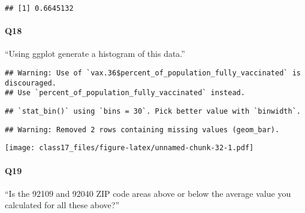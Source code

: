 \documentclass[
]{article}
\newenvironment{Shaded}{\begin{snugshade}}{\end{snugshade}}
\newcommand{\AttributeTok}[1]{\textcolor[rgb]{0.77,0.63,0.00}{#1}}
\newcommand{\CommentTok}[1]{\textcolor[rgb]{0.56,0.35,0.01}{\textit{#1}}}
\newcommand{\DecValTok}[1]{\textcolor[rgb]{0.00,0.00,0.81}{#1}}
\newcommand{\FloatTok}[1]{\textcolor[rgb]{0.00,0.00,0.81}{#1}}
\newcommand{\FunctionTok}[1]{\textcolor[rgb]{0.00,0.00,0.00}{#1}}
\newcommand{\NormalTok}[1]{#1}
\newcommand{\SpecialCharTok}[1]{\textcolor[rgb]{0.00,0.00,0.00}{#1}}
\newcommand{\StringTok}[1]{\textcolor[rgb]{0.31,0.60,0.02}{#1}}
\begin{document}
\begin{verbatim}
## [1] 0.6645132
\end{verbatim}

\hypertarget{q18}{%
\paragraph{Q18}\label{q18}}

``Using ggplot generate a histogram of this data.''

\begin{Shaded}
\end{Shaded}

\begin{verbatim}
## Warning: Use of `vax.36$percent_of_population_fully_vaccinated` is discouraged.
## Use `percent_of_population_fully_vaccinated` instead.
\end{verbatim}

\begin{verbatim}
## `stat_bin()` using `bins = 30`. Pick better value with `binwidth`.
\end{verbatim}

\begin{verbatim}
## Warning: Removed 2 rows containing missing values (geom_bar).
\end{verbatim}

\texttt{[image: class17\_files/figure-latex/unnamed-chunk-32-1.pdf]}

\hypertarget{q19}{%
\paragraph{Q19}\label{q19}}

``Is the 92109 and 92040 ZIP code areas above or below the average value
you calculated for all these above?''

\begin{Shaded}
\end{Shaded}
\end{document}
